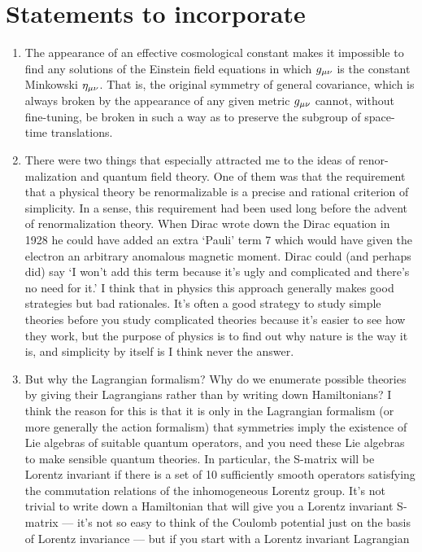 \section{Statements to incorporate}
\begin{enumerate}
	\item The
	appearance of an effective cosmological constant makes it
	impossible to find any solutions of the Einstein field equations in which $g_{\mu \nu}$ is the constant Minkowski  $\eta_{\mu \nu}$. That is, the original symmetry of general covariance,
	which is always broken by the appearance of any given
	metric $g_{\mu \nu}$
	cannot, without fine-tuning, be broken in
	such a way as to preserve the subgroup of space-time
	translations.
	\item There were two things that especially attracted me to the ideas of renor-
	malization and quantum field theory. One of them was that the requirement
	that a physical theory be renormalizable is a precise and rational criterion of
	simplicity. In a sense, this requirement had been used long before the advent
	of renormalization theory. When Dirac wrote down the Dirac equation in
	1928 he could have added an extra ‘Pauli’ term 7 which would have given
	the electron an arbitrary anomalous magnetic moment. Dirac could (and perhaps did) say ‘I won’t add this term because it’s ugly and complicated
	and there’s no need for it.’ I think that in physics this approach generally
	makes good strategies but bad rationales. It’s often a good strategy to study
	simple theories before you study complicated theories because it’s easier to
	see how they work, but the purpose of physics is to find out why nature is
	the way it is, and simplicity by itself is I think never the answer.
	\item But
	why the Lagrangian formalism? Why do we enumerate possible theories by
	giving their Lagrangians rather than by writing down Hamiltonians? I think
	the reason for this is that it is only in the Lagrangian formalism (or more
	generally the action formalism) that symmetries imply the existence of Lie
	algebras of suitable quantum operators, and you need these Lie algebras to
	make sensible quantum theories. In particular, the S-matrix will be Lorentz
	invariant if there is a set of 10 sufficiently smooth operators satisfying the
	commutation relations of the inhomogeneous Lorentz group. It’s not trivial
	to write down a Hamiltonian that will give you a Lorentz invariant S-matrix
	— it’s not so easy to think of the Coulomb potential just on the basis of
	Lorentz invariance — but if you start with a Lorentz invariant Lagrangian

\end{enumerate}
